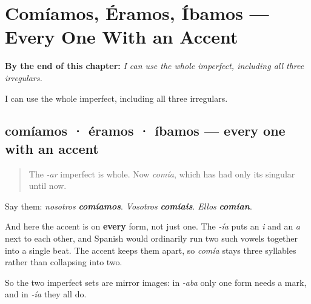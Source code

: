 
\chapter{Comíamos, Éramos, Íbamos --- Every One With an Accent}
\label{ch:comiamos}

\begin{chapteropening}
\textbf{By the end of this chapter:} \emph{I can use the whole imperfect, including all three irregulars.}

I can use the whole imperfect, including all three irregulars.
\end{chapteropening}

\section[comíamos · éramos · íbamos]{comíamos · éramos · íbamos — every one with an accent}

\label{lesson:ES-C63-comiamos}



\begin{quote}
The \emph{-ar} imperfect is whole. Now \emph{comía}, which has had only its singular until now.
\end{quote}

\begin{grammarlens}[title={Grammar Lens: the -ía plural}]
Say them: \emph{nosotros} \emph{\textbf{comíamos}}. \emph{Vosotros} \emph{\textbf{comíais}}. \emph{Ellos} \emph{\textbf{comían}}.

And here the accent is on \textbf{every} form, not just one. The \emph{-ía} puts an \emph{i} and an \emph{a} next to each other, and Spanish would ordinarily run two such vowels together into a single beat. The accent keeps them apart, so \emph{comía} stays three syllables rather than collapsing into two.

So the two imperfect sets are mirror images: in \emph{-aba} only one form needs a mark, and in \emph{-ía} they all do.
\end{grammarlens}

